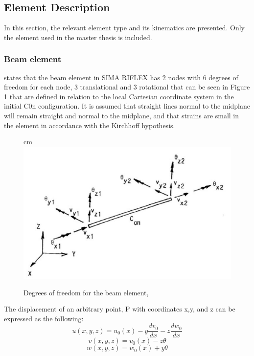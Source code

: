 \subsection{Element Description}
In this section, the relevant element type and its kinematics are presented. Only the element used in the master thesis is included. 
\subsubsection{Beam element}
\noindent \cite{sintef2017} states that the beam element in SIMA RIFLEX has 2 nodes with 6 degrees of freedom for each node, 3 translational and 3 rotational that can be seen in Figure \ref{fig:beamri} that are defined in relation to the local Cartesian coordinate system in the initial C0n configuration. It is assumed that straight lines normal to the midplane will remain straight and normal to the midplane, and that strains are small in the element in accordance with the Kirchhoff hypothesis.\newline
\newline
\begin{figure}
     cm 
    \centering
   \includegraphics[scale=0.5]{figures/beamri}
\caption[$\; \:$Beam Element]{Degrees of freedom for the beam element, \cite{sintef2017} }
 \label{fig:beamri}
\end{figure} The displacement of an arbitrary point, P with coordinates x,y, and z can be expressed as the following:
\begin{equation}
    u(x,y,z)=u_0(x) - y \frac{dv_0}{dx} - z \frac{dw_0}{dx}
\end{equation}
\begin{equation}
    v(x,y,z)=v_0(x) - z \theta
\end{equation}
\begin{equation}
    w(x,y,z)=w_0(x) + y \theta
\end{equation}


